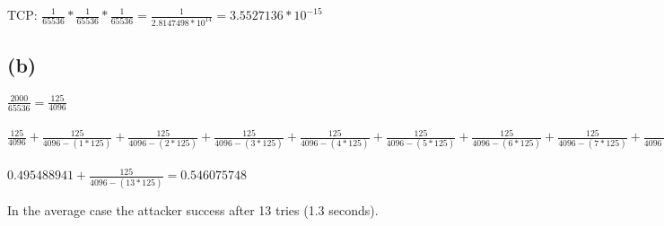 \documentclass[12pt,pdftex,a4paper]{article}
\begin{document}
TCP: $ \frac{1}{65536} * \frac{1}{65536} * \frac{1}{65536} = \frac{1}{2.8147498*10^{14}} = 3.5527136*10^{-15} $

\subsection*{(b)}
$ \frac{2000}{65536} = \frac{125}{4096} $
\\~\\
$ \frac{125}{4096} + \frac{125}{4096-(1*125)} + \frac{125}{4096-(2*125)} + \frac{125}{4096-(3*125)} + \frac{125}{4096-(4*125)} + \frac{125}{4096-(5*125)} + \frac{125}{4096-(6*125)} + \frac{125}{4096-(7*125)} + \frac{125}{4096-(8*125)} + \frac{125}{4096-(9*125)} + \frac{125}{4096-(10*125)} + \frac{125}{4096-(11*125)} + \frac{125}{4096-(12*125)} = 0.495488941$
\\~\\
$ 0.495488941 + \frac{125}{4096-(13*125)} = 0.546075748 $

In the average case the attacker success after 13 tries (1.3 seconds).
\end{document}
